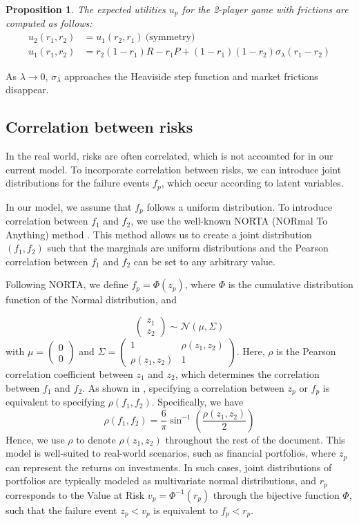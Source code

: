 \documentclass[preprint,12pt,authoryear,doubleblind]{elsarticle}
\newtheorem{proposition}[theorem]{Proposition}
\theoremstyle{definition}
\begin{document}
\begin{proposition}
The expected utilities $u_p$ for the 2-player game with frictions are computed as follows:
\begin{align*}
    u_2(r_1, r_2) &= u_1(r_2, r_1) ~\text{(symmetry)}\\
    u_1(r_1, r_2) &= r_2 (1-r_1) R - r_1 P + (1-r_1)(1-r_2) \sigma_\lambda(r_1 - r_2)
\end{align*}
\end{proposition}

As $\lambda \rightarrow 0$, $\sigma_\lambda$ approaches the Heaviside step function and market frictions disappear.

\subsection{Correlation between risks}

In the real world, risks are often correlated, which is not accounted for in our current model. To incorporate correlation between risks, we can introduce joint distributions for the failure events $f_p$, which occur according to latent variables.

In our model, we assume that $f_p$ follows a uniform distribution. To introduce correlation between $f_1$ and $f_2$, we use the well-known NORTA (NORmal To Anything) method \citep{norta1997}. This method allows us to create a joint distribution $(f_1, f_2)$ such that the marginals are uniform distributions and the Pearson correlation between $f_1$ and $f_2$ can be set to any arbitrary value.

Following NORTA, we define $f_p = \Phi(z_p)$, where $\Phi$ is the cumulative distribution function of the Normal distribution, and

$$\begin{pmatrix}z_1\\z_2\end{pmatrix} \sim \mathcal{N}\left(\mu, \Sigma\right)$$
with $\mu = \begin{pmatrix}0\\0\end{pmatrix}$ and 
$\Sigma = \begin{pmatrix}
    1 & \rho(z_1, z_2) \\
    \rho(z_1, z_2) & 1
\end{pmatrix}$.
Here, $\rho$ is the Pearson correlation coefficient between $z_1$ and $z_2$, which determines the correlation between $f_1$ and $f_2$.
As shown in \citet{norta1997}, specifying a correlation between $z_p$ or $f_p$ is equivalent to specifying $\rho(f_1, f_2)$. Specifically, we have $$\rho(f_1, f_2) = \frac{6}{\pi}\sin^{-1}\left(\frac{\rho(z_1, z_2)}{2}\right)$$ 
Hence, we use $\rho$ to denote $\rho(z_1, z_2)$ throughout the rest of the document.
This model is well-suited to real-world scenarios, such as financial portfolios, where $z_p$ can represent the returns on investments. In such cases, joint distributions of portfolios are typically modeled as multivariate normal distributions, and $r_p$ corresponds to the Value at Risk $v_p = \Phi^{-1}(r_p)$ through the bijective function $\Phi$, such that the failure event $z_p < v_p$ is equivalent to $f_p < r_p$.
\end{document}
